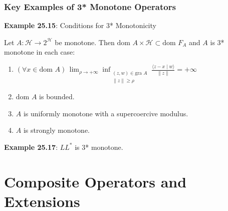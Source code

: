 \documentclass[aspectratio=169,10pt]{beamer}
\begin{document}
\begin{frame}[fragile]
  \frametitle{Key Examples of 3* Monotone Operators}

  \textbf{Example 25.15}: Conditions for 3* Monotonicity

  Let $A: \mathcal{H} \to 2^{\mathcal{H}}$ be monotone. Then $\text{dom } A \times \mathcal{H} \subset \text{dom } F_A$ and
  $A$ is 3* monotone in each case:

  \begin{enumerate}
    \item[(i)] $(\forall x \in \text{dom } A) \, \lim_{\rho \to +\infty} \inf_{\substack{(z,w) \in \text{gra } A \\ \|z\| \geq \rho}} \frac{\langle z - x \mid w \rangle}{\|z\|} = +\infty$
    \item[(ii)] $\text{dom } A$ is bounded.
    \item[(iii)] $A$ is uniformly monotone with a supercoercive modulus.
    \item[(iv)] $A$ is strongly monotone.
  \end{enumerate}

  \vspace{0.3cm}

  \textbf{Example 25.17}: $LL^*$ is 3* monotone.

\end{frame}

\section{Composite Operators and Extensions}
\end{document}
